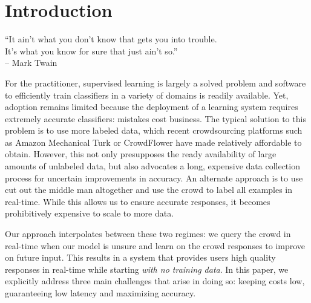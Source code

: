 
\section{Introduction}

\begin{epigraph}
``It ain't what you don't know that gets you into trouble.\\
It's what you know for sure that just ain't so.'' \\
-- Mark Twain
\end{epigraph}

For the practitioner, supervised learning is largely a solved problem and software to efficiently train classifiers in a variety of domains is readily available.
Yet, adoption remains limited because the deployment of a learning system requires extremely accurate classifiers: mistakes cost business.
The typical solution to this problem is to use more labeled data, which recent crowdsourcing platforms such as Amazon Mechanical Turk or CrowdFlower have made relatively affordable to obtain.
However, this not only presupposes the ready availability of large amounts of unlabeled data, but also advocates a long, expensive data collection process for uncertain improvements in accuracy.
An alternate approach is to use cut out the middle man altogether and use the crowd to label all examples in real-time\cite{cheng2015flock}. 
While this allows us to ensure accurate responses, it becomes prohibitively expensive to scale to more data. 

Our approach interpolates between these two regimes: we query the crowd in real-time when our model is unsure and learn on the crowd responses to improve on future input.
This results in a system that provides users high quality responses in real-time while starting {\em with no training data}.
In this paper, we explicitly address three main challenges that arise in doing so: keeping costs low, guaranteeing low latency and maximizing accuracy.

